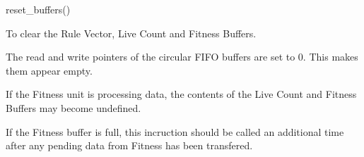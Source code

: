 

\format
reset\_buffers()

\purpose

To clear the Rule Vector, Live Count and Fitness Buffers.

\description

The read and write pointers of the circular FIFO buffers are set to 0.
This makes them appear empty.

\notes

If the Fitness unit is processing data, the contents of the Live Count and Fitness Buffers may become undefined.

If the Fitness buffer is full, this incruction should be called an additional time after any pending data from Fitness has been transfered.
